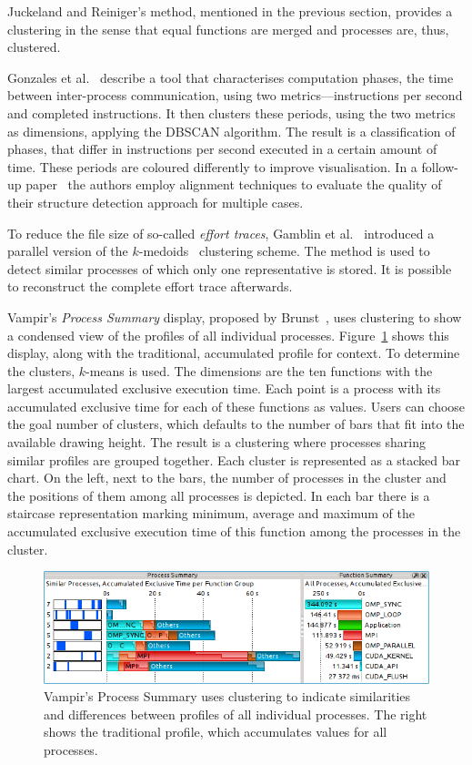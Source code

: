 \documentclass[a4paper, final, diplominf]{zih-template}
\begin{document}
Juckeland and Reiniger's method, mentioned in the previous section, provides a clustering in the sense that equal functions are merged and processes are, thus, clustered.

Gonzales et al.~\cite{gonzalez09a} describe a tool that characterises computation phases, the time between inter-process communication, using two metrics---instructions per second and completed instructions.
It then clusters these periods, using the two metrics as dimensions, applying the DBSCAN algorithm.
The result is a classification of phases, that differ in instructions per second executed in a certain amount of time.
These periods are coloured differently to improve visualisation.
In a follow-up paper~\cite{gonzalez09b} the authors employ alignment techniques to evaluate the quality of their structure detection approach for multiple cases.

To reduce the file size of so-called \emph{effort traces}, Gamblin et al.~\cite{gamblin10} introduced a parallel version of the $k$-medoids~\cite{kaufman87} clustering scheme.
The method is used to detect similar processes of which only one representative is stored.
It is possible to reconstruct the complete effort trace afterwards.

Vampir's \emph{Process Summary} display, proposed by Brunst~\cite{brunst07}, uses clustering to show a condensed view of the profiles of all individual processes.
Figure~\ref{fig:clustering-in-vampir} shows this display, along with the traditional, accumulated profile for context.
To determine the clusters, $k$-means is used.
The dimensions are the ten functions with the largest accumulated exclusive execution time.
Each point is a process with its accumulated exclusive time for each of these functions as values.
Users can choose the goal number of clusters, which defaults to the number of bars that fit into the available drawing height.
The result is a clustering where processes sharing similar profiles are grouped together.
Each cluster is represented as a stacked bar chart.
On the left, next to the bars, the number of processes in the cluster and the positions of them among all processes is depicted.
In each bar there is a staircase representation marking minimum, average and maximum of the accumulated exclusive execution time of this function among the processes in the cluster.
\begin{figure}[tb]
	\centering
	\includegraphics[width=13.08cm]{clustering-in-vampir}
	\caption{Vampir's Process Summary uses clustering to indicate similarities and differences between profiles of all individual processes. The right shows the traditional profile, which accumulates values for all processes.}
	\label{fig:clustering-in-vampir}
\end{figure}
\end{document}

